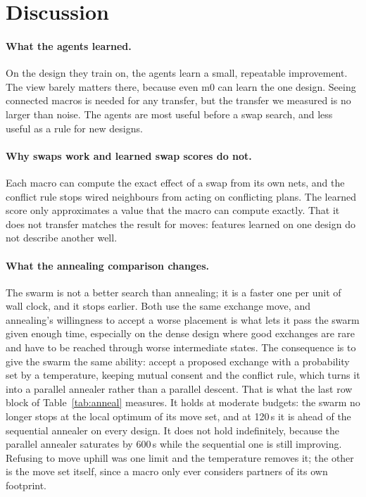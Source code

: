 \documentclass[10pt]{article}
\begin{document}
\section{Discussion}

\paragraph{What the agents learned.} On the design they train on, the agents learn a small, repeatable improvement. The view barely matters there, because even m0 can learn the one design. Seeing connected macros is needed for any transfer, but the transfer we measured is no larger than noise. The agents are most useful before a swap search, and less useful as a rule for new designs.

\paragraph{Why swaps work and learned swap scores do not.} Each macro can compute the exact effect of a swap from its own nets, and the conflict rule stops wired neighbours from acting on conflicting plans. The learned score only approximates a value that the macro can compute exactly. That it does not transfer matches the result for moves: features learned on one design do not describe another well.

\paragraph{What the annealing comparison changes.} The swarm is not a better search than annealing; it is a faster one per unit of wall clock, and it stops earlier. Both use the same exchange move, and annealing's willingness to accept a worse placement is what lets it pass the swarm given enough time, especially on the dense design where good exchanges are rare and have to be reached through worse intermediate states. The consequence is to give the swarm the same ability: accept a proposed exchange with a probability set by a temperature, keeping mutual consent and the conflict rule, which turns it into a parallel annealer rather than a parallel descent. That is what the last row block of Table~\ref{tab:anneal} measures. It holds at moderate budgets: the swarm no longer stops at the local optimum of its move set, and at 120\,s it is ahead of the sequential annealer on every design. It does not hold indefinitely, because the parallel annealer saturates by 600\,s while the sequential one is still improving. Refusing to move uphill was one limit and the temperature removes it; the other is the move set itself, since a macro only ever considers partners of its own footprint.
\end{document}
